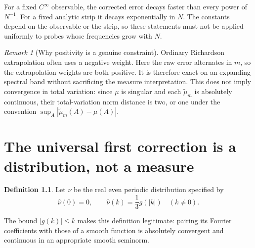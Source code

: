 \documentclass[11pt,a4paper,oneside,openany]{book}
\numberwithin{equation}{chapter}
\theoremstyle{definition}
\newtheorem{definition}[theorem]{Definition}
\theoremstyle{remark}
\newtheorem{remark}[theorem]{Remark}
\newcommand{\mt}{\widetilde\mu}
\begin{document}
For a fixed $C^\infty$ observable, the corrected error decays faster than every
power of $N^{-1}$. For a fixed analytic strip it decays exponentially in $N$.
The constants depend on the observable or the strip, so these statements must
not be applied uniformly to probes whose frequencies grow with $N$.

\begin{remark}[Why positivity is a genuine constraint]
Ordinary Richardson extrapolation often uses a negative weight. Here the raw
error alternates in $m$, so the extrapolation weights are both positive. It is
therefore exact on an expanding spectral band without sacrificing the measure
interpretation. This does not imply convergence in total variation: since $\mu$
is singular and each $\mt_m$ is absolutely continuous, their total-variation norm
distance is two, or one under the convention $\sup_A|\mt_m(A)-\mu(A)|$.
\end{remark}
\chapter{The universal first correction is a distribution, not a measure}
\label{bc:sec:distribution}

\begin{definition}
Let $\nu$ be the real even periodic distribution specified by
\begin{equation}
 \widehat\nu(0)=0,\qquad
 \widehat\nu(k)=\frac13g(|k|)\quad(k\ne0).
 \label{bc:eq:nu}
\end{equation}
\end{definition}
The bound $|g(k)|\le k$ makes this definition legitimate: pairing its Fourier
coefficients with those of a smooth function is absolutely convergent and
continuous in an appropriate smooth seminorm.
\end{document}
